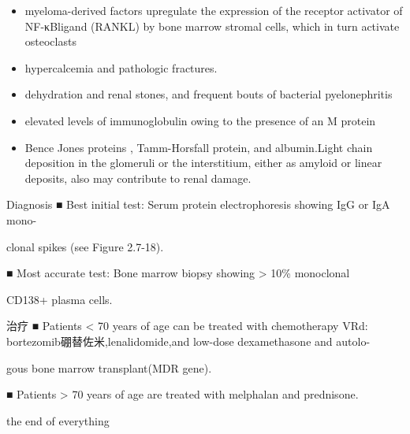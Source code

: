 \documentclass[
  ignorenonframetext,
]{beamer}
\begin{document}
\begin{frame}
\begin{itemize}
\item
  myeloma-derived factors upregulate the expression of the receptor
  activator of NF-κBligand (RANKL) by bone marrow stromal cells, which
  in turn activate osteoclasts
\item
  hypercalcemia and pathologic fractures.
\item
  dehydration and renal stones, and frequent bouts of bacterial
  pyelonephritis
\item
  elevated levels of immunoglobulin owing to the presence of an M
  protein
\item
  Bence Jones proteins , Tamm-Horsfall protein, and albumin.Light chain
  deposition in the glomeruli or the interstitium, either as amyloid or
  linear deposits, also may contribute to renal damage.
\end{itemize}
\end{frame}

\begin{frame}
\begin{block}{Diagnosis}
\protect\hypertarget{diagnosis-4}{}
■ Best initial test: Serum protein electrophoresis showing IgG or IgA
mono-

clonal spikes (see Figure 2.7-18).

■ Most accurate test: Bone marrow biopsy showing \textgreater{} 10\%
monoclonal

CD138+ plasma cells.
\end{block}
\end{frame}

\begin{frame}
\begin{block}{治疗}
\protect\hypertarget{ux6cbbux7597-12}{}
■ Patients \textless{} 70 years of age can be treated with chemotherapy
VRd: bortezomib硼替佐米,lenalidomide,and low-dose dexamethasone and
autolo-

gous bone marrow transplant(MDR gene).

■ Patients \textgreater{} 70 years of age are treated with melphalan and
prednisone.
\end{block}
\end{frame}

\begin{frame}
\begin{block}{the end of everything}
\protect\hypertarget{the-end-of-everything}{}
\end{block}
\end{frame}
\end{document}
